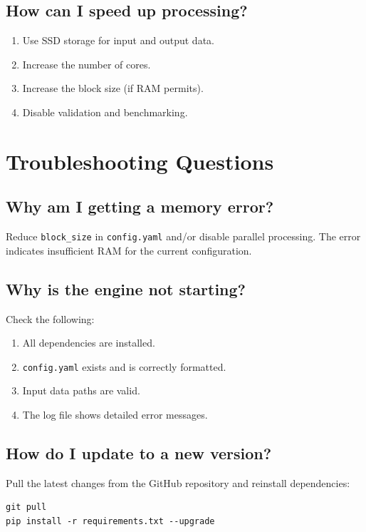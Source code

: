 ﻿\documentclass[12pt,a4paper]{report}
\begin{document}
\subsection{How can I speed up processing?}
\begin{enumerate}
    \item Use SSD storage for input and output data.
    \item Increase the number of cores.
    \item Increase the block size (if RAM permits).
    \item Disable validation and benchmarking.
\end{enumerate}

\section{Troubleshooting Questions}

\subsection{Why am I getting a memory error?}
Reduce \texttt{block\_size} in \texttt{config.yaml} and/or disable parallel processing. The error indicates insufficient RAM for the current configuration.

\subsection{Why is the engine not starting?}
Check the following:
\begin{enumerate}
    \item All dependencies are installed.
    \item \texttt{config.yaml} exists and is correctly formatted.
    \item Input data paths are valid.
    \item The log file shows detailed error messages.
\end{enumerate}

\subsection{How do I update to a new version?}
Pull the latest changes from the GitHub repository and reinstall dependencies:

\begin{lstlisting}[caption=Updating to a New Version]
git pull
pip install -r requirements.txt --upgrade
\end{lstlisting}
\end{document}
